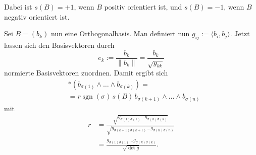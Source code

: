 \documentclass[a4paper,10pt,fleqn,twocolumn,twoside]{article}
\numberwithin{equation}{section}
\newcommand{\sgn}{\operatorname{sgn}}
\begin{document}
Dabei ist $s(B)=+1$, wenn $B$ positiv orientiert ist,
und $s(B)=-1$, wenn $B$ negativ orientiert ist.

Sei $B=(b_k)$ nun eine Orthogonalbasis. Man definiert nun
$g_{ij}:=\langle b_i,b_j\rangle$. Jetzt lassen sich den
Basisvektoren durch
\begin{equation}
e_k := \frac{b_k}{\|b_k\|} = \frac{b_k}{\sqrt{g_{kk}}}
\end{equation}
normierte Basisvektoren zuordnen. Damit ergibt sich
\begin{equation}
\begin{split}
&*(b_{\sigma(1)}\wedge\ldots\wedge b_{\sigma(k)}) =\\
&= r \sgn(\sigma)\,s(B)\,b_{\sigma(k+1)}\wedge\ldots\wedge b_{\sigma(n)}
\end{split}
\end{equation}
mit
\begin{equation}
\begin{split}
r &= \frac{\sqrt{g_{\sigma(1)\sigma(1)}\ldots g_{\sigma(k)\sigma(k)}}}
{\sqrt{g_{\sigma(k+1)\sigma(k+1)}\ldots g_{\sigma(n)\sigma(n)}}}\\
&=\frac{g_{\sigma(1)\sigma(1)}\ldots g_{\sigma(k)\sigma(k)}}{\sqrt{\det g}}.
\end{split}
\end{equation}
\end{document}
